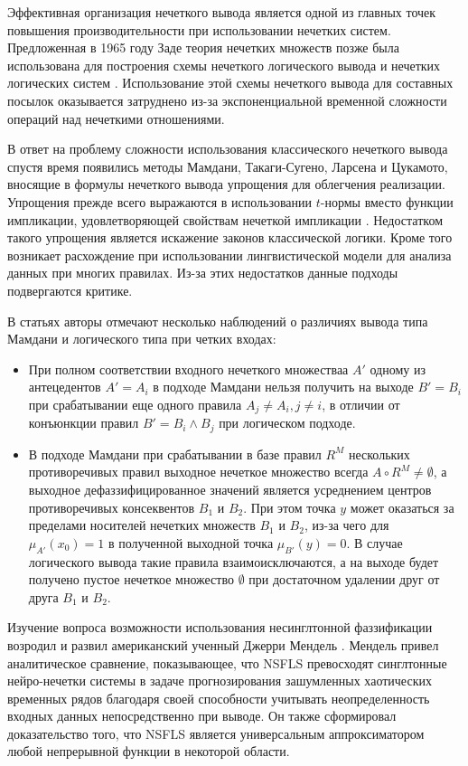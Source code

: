 Эффективная организация нечеткого вывода является одной из главных точек повышения производительности при использовании нечетких систем.  Предложенная в 1965 году Заде теория нечетких множеств \cite{zadeh1965} позже была использована для построения схемы нечеткого логического вывода \cite{Zadeh1996} и нечетких логических систем \cite{rutkovskiy2010}. Использование этой схемы нечеткого вывода для составных посылок оказывается затруднено из-за экспоненциальной временной сложности операций над нечеткими отношениями.

В ответ на проблему сложности использования классического нечеткого вывода спустя время появились методы Мамдани, Такаги-Сугено, Ларсена и Цукамото, вносящие в формулы нечеткого вывода упрощения для облегчения реализации. Упрощения прежде всего выражаются в использовании $t$-нормы вместо функции импликации, удовлетворяющей свойствам нечеткой импликации \cite{rutkovskiy2010}. Недостатком такого упрощения является искажение законов классической логики. Кроме того возникает расхождение при использовании лингвистической модели для анализа данных при многих правилах. Из-за этих недостатков данные подходы подвергаются критике.

В статьях \cite{Dubois2012, Izquierdo2018} авторы отмечают несколько наблюдений о различиях вывода типа Мамдани и логического типа при четких входах:
\begin{itemize}
	\item При полном соответствии входного нечеткого множестваа $A'$ одному из антецедентов $A' = A_i$ в подходе Мамдани нельзя получить на выходе $B' = B_i$ при срабатывании еще одного правила $A_j \ne A_i, j \ne i$, в отличии от конъюнкции правил $B' = B_i \wedge B_j$ при логическом подходе.
	\item В подходе Мамдани при срабатывании в базе правил $R^M$ нескольких противоречивых правил выходное нечеткое множество всегда $A \circ R^M \ne \emptyset$, а выходное дефаззифицированное значений является усреднением центров противоречивых консеквентов $B_1$ и $B_2$. При этом точка $y$ может оказаться за пределами носителей нечетких множеств  $B_1$ и $B_2$, из-за чего для $\mu_{A'}(x_0)=1$ в полученной выходной точка $\mu_{B'}(y)=0$. В случае логического вывода такие правила взаимоисключаются, а на выходе будет получено пустое нечеткое множество $\emptyset$ при достаточном удалении друг от друга $B_1$ и $B_2$.
\end{itemize}

Изучение вопроса возможности использования несинглтонной фаззификации возродил и развил американский ученный Джерри Мендель \cite{Mendel2017}. Мендель привел аналитическое сравнение, показывающее, что NSFLS превосходят синглтонные нейро-нечетки системы в задаче прогнозирования зашумленных хаотических временных рядов благодаря своей способности учитывать неопределенность входных данных непосредственно при выводе. Он также сформировал доказательство того, что NSFLS является универсальным аппроксиматором любой непрерывной функции в некоторой области.

